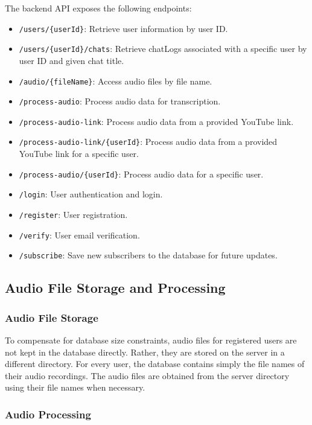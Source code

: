 \documentclass[conference]{IEEEtran}
\begin{document}
The backend API exposes the following endpoints:

\begin{itemize}
    \item \texttt{/users/\{userId\}}: Retrieve user information by user ID.
    \item \texttt{/users/\{userId\}/chats}: Retrieve chatLogs associated with a specific user by user ID and given chat title.
    \item \texttt{/audio/\{fileName\}}: Access audio files by file name.
    \item \texttt{/process-audio}: Process audio data for transcription.
    \item \texttt{/process-audio-link}: Process audio data from a provided YouTube link.
    \item \texttt{/process-audio-link/\{userId\}}: Process audio data from a provided YouTube link for a specific user.
    \item \texttt{/process-audio/\{userId\}}: Process audio data for a specific user.
    \item \texttt{/login}: User authentication and login.
    \item \texttt{/register}: User registration.
    \item \texttt{/verify}: User email verification.
    \item \texttt{/subscribe}: Save new subscribers to the database for future updates.
\end{itemize}


\subsection{Audio File Storage and Processing}

\subsubsection{Audio File Storage}

To compensate for database size constraints, audio files for registered users are not kept in the database directly. Rather, they are stored on the server in a different directory. For every user, the database contains simply the file names of their audio recordings. The audio files are obtained from the server directory using their file names when necessary.

\subsubsection{Audio Processing}
\end{document}
